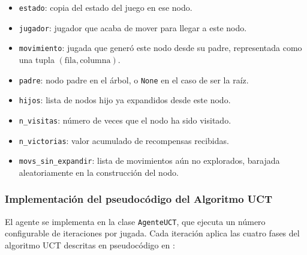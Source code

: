 \documentclass[conference,a4paper]{IEEEtran}
\begin{document}
\begin{itemize}
  \item \texttt{estado}: copia del estado del juego en ese nodo.
  \item \texttt{jugador}: jugador que acaba de mover para llegar a este nodo.
  \item \texttt{movimiento}: jugada que generó este nodo desde su padre,
  representada como una tupla $(\text{fila}, \text{columna})$.
  \item \texttt{padre}: nodo padre en el árbol, o \texttt{None} en el caso de ser la raíz.
  \item \texttt{hijos}: lista de nodos hijo ya expandidos desde este nodo.
  \item \texttt{n\_visitas}: número de veces que el nodo ha sido visitado.
  \item \texttt{n\_victorias}: valor acumulado de recompensas recibidas.
  \item \texttt{movs\_sin\_expandir}: lista de movimientos aún no explorados,
  barajada aleatoriamente en la construcción del nodo.
\end{itemize}


\subsubsection{\textbf{Implementación del pseudocódigo del Algoritmo UCT}}

El agente se implementa en la clase \texttt{AgenteUCT}, que ejecuta un número configurable de iteraciones por jugada. Cada iteración aplica las cuatro fases del algoritmo UCT descritas en pseudocódigo en \cite{b2}:
\end{document}
